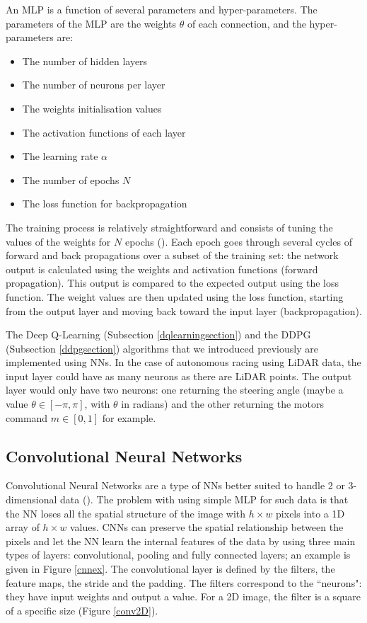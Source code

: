 An MLP is a function of several parameters and hyper-parameters. The parameters of the MLP are the weights $\theta$ of each connection, and the hyper-parameters are:
\begin{itemize}
	\item The number of hidden layers
	\item The number of neurons per layer
	\item The weights initialisation values
	\item The activation functions of each layer
	\item The learning rate $\alpha$
	\item The number of epochs $N$
	\item The loss function for backpropagation
\end{itemize}

The training process is relatively straightforward and consists of tuning the values of the weights for $N$ epochs (\cite{mlptraining}). Each epoch goes through several cycles of forward and back propagations over a subset of the training set: the network output is calculated using the weights and activation functions (forward propagation). This output is compared to the expected output using the loss function. The weight values are then updated using the loss function, starting from the output layer and moving back toward the input layer (backpropagation).


The Deep Q-Learning (Subsection \ref{dqlearningsection}) and the DDPG (Subsection \ref{ddpgsection}) algorithms that we introduced previously are implemented using NNs. In the case of autonomous racing using LiDAR data, the input layer could have as many neurons as there are LiDAR points. The output layer would only have two neurons: one returning the steering angle (maybe a value $\theta \in [-\pi,\pi]$, with $\theta$ in radians) and the other returning the motors command $m \in [0,1]$ for example.


\subsection{Convolutional Neural Networks}

Convolutional Neural Networks are a type of NNs better suited to handle 2 or 3-dimensional data (\cite{cnnintro}). The problem with using simple MLP for such data is that the NN loses all the spatial structure of the image with $h \times w$ pixels into a 1D array of $h \times w$ values. CNNs can preserve the spatial relationship between the pixels and let the NN learn the internal features of the data by using three main types of layers: convolutional, pooling and fully connected layers; an example is given in Figure \ref{cnnex}. \newline
The convolutional layer is defined by the filters, the feature maps, the stride and the padding. The filters correspond to the ``neurons": they have input weights and output a value. For a 2D image, the filter is a square of a specific size (Figure \ref{conv2D}).

